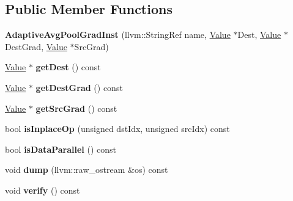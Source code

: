 \subsection*{Public Member Functions}
\begin{DoxyCompactItemize}
\item 
\mbox{\label{classglow_1_1_adaptive_avg_pool_grad_inst_aecc21effe84603630e6ffb12cd75a394}} 
{\bfseries Adaptive\+Avg\+Pool\+Grad\+Inst} (llvm\+::\+String\+Ref name, \hyperlink{classglow_1_1_value}{Value} $\ast$Dest, \hyperlink{classglow_1_1_value}{Value} $\ast$Dest\+Grad, \hyperlink{classglow_1_1_value}{Value} $\ast$Src\+Grad)
\item 
\mbox{\label{classglow_1_1_adaptive_avg_pool_grad_inst_ab94f6246191a838f49a642098bb1915f}} 
\hyperlink{classglow_1_1_value}{Value} $\ast$ {\bfseries get\+Dest} () const
\item 
\mbox{\label{classglow_1_1_adaptive_avg_pool_grad_inst_a90a86509371c3ad1c373e71132976c2f}} 
\hyperlink{classglow_1_1_value}{Value} $\ast$ {\bfseries get\+Dest\+Grad} () const
\item 
\mbox{\label{classglow_1_1_adaptive_avg_pool_grad_inst_a59e9e54de395c2da6323bb95774737ed}} 
\hyperlink{classglow_1_1_value}{Value} $\ast$ {\bfseries get\+Src\+Grad} () const
\item 
\mbox{\label{classglow_1_1_adaptive_avg_pool_grad_inst_ada72918a1fda6316c56474d7daf98b20}} 
bool {\bfseries is\+Inplace\+Op} (unsigned dst\+Idx, unsigned src\+Idx) const
\item 
\mbox{\label{classglow_1_1_adaptive_avg_pool_grad_inst_a0e5ff7dc8ac6d8320727f35c03fe6b72}} 
bool {\bfseries is\+Data\+Parallel} () const
\item 
\mbox{\label{classglow_1_1_adaptive_avg_pool_grad_inst_a7cc3955c18c8791a9e3c54b4d327e64a}} 
void {\bfseries dump} (llvm\+::raw\+\_\+ostream \&os) const
\item 
\mbox{\label{classglow_1_1_adaptive_avg_pool_grad_inst_a3148059273887a8e53582025b0ced3e5}} 
void {\bfseries verify} () const
\end{DoxyCompactItemize}
